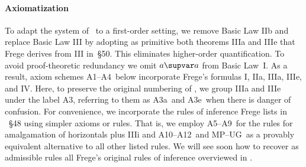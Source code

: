 \documentclass{preprint}
\newcommand{\ia}{A1}%
\newcommand{\iiia}{A3a}%
\newcommand{\iiie}{A3e}%
\newcommand{\iv}{A4}%
\newcommand{\ahor}{A5}%
\newcommand{\aid}{A9}%
\newcommand{\hypsyll}{A10}%
\newcommand{\fug}{A12}%
\renewcommand{\mp}{MP}%
\newcommand{\ug}{UG}%
\renewcommand{\to}{\supvar}
\begin{document}
\paragraph{Axiomatization} \label{subsec:axiomatization}  

To adapt the system of \gga~to a first-order setting, we remove Basic Law IIb and replace Basic Law III by adopting as primitive both theorems IIIa and IIIe that Frege derives from III in~\S50. This eliminates higher-order quantification. 
To avoid proof-theoretic redundancy we omit $a \to a$ from Basic Law~I. 
As a result, axiom schemes \ia--\iv~below incorporate Frege's formulas I, IIa, IIIa, IIIe, and IV. 
Here, to preserve the original numbering of \gga, we group IIIa and IIIe under the label A3, referring to them as \iiia~and \iiie~when there is danger of confusion. 
For convenience, we incorporate the rules of inference Frege lists in \gga~\S48 using simpler axioms or rules. 
That is, we employ \ahor--\aid~for the rules for amalgamation of horizontals plus IIIi and \hypsyll--\fug~and \mp--\ug~as a provably equivalent alternative to all other listed rules. 
We will see soon how to recover as admissible rules all Frege's original rules of inference overviewed in . 
\end{document}
